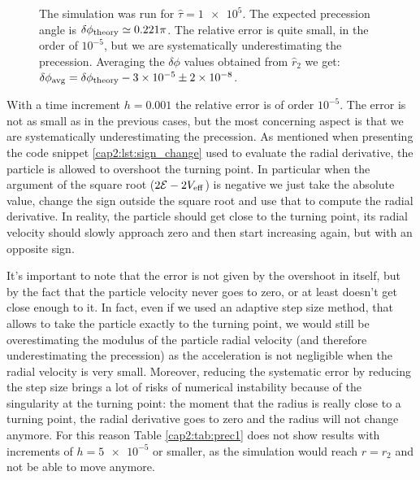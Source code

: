 \begin{figure}[h]
\begin{minipage}{0.48 \textwidth}
        \caption{The simulation was run for $\hat \tau = \num{1e5}$.
        The expected precession angle is $\delta \phi_{\rm theory} \simeq 0.221
        \pi$.
        The relative error is quite small, in the order of $10^{-5}$, but we are
        systematically underestimating the precession.
        Averaging the $\delta \phi$ values obtained from $\hat r_2$ we get: \\
        $\delta \phi_{\rm avg} = \delta \phi_{\rm theory} - \num{3e-5} \pm \num{2e-8}$.}
        \label{cap2:fig:prec2_res}
    \end{minipage}
\end{figure}

With a time increment $h = 0.001$ the relative error is of order $10^{-5}$.
The error is not as small as in the previous cases, but the most concerning
aspect is that we are systematically underestimating the precession.
As mentioned when presenting the code snippet \ref{cap2:lst:sign_change} used to
evaluate the radial derivative, the particle is allowed to overshoot the turning
point.
In particular when the argument of the square root ($2 \mathcal E
- 2 V_{\rm eff}$) is negative we just take the absolute value, change the sign
outside the square root and use that to compute the radial derivative.
In reality, the particle should get close to the turning point, its radial
velocity should slowly approach zero and then start increasing again, but with
an opposite sign.

It's important to note that the error is not given by the overshoot in itself,
but by the fact that the particle velocity never goes to zero, or at least
doesn't get close enough to it.
In fact, even if we used an adaptive step size method, that allows to take the
particle exactly to the turning point, we would still be overestimating the
modulus of the particle radial velocity (and therefore underestimating the
precession) as the acceleration is not negligible when the radial velocity is
very small.
Moreover, reducing the systematic error by reducing the step size brings a lot
of risks of numerical instability because of the singularity at the turning
point: the moment that the radius is really close to a turning point, the radial
derivative goes to zero and the radius will not change anymore.
For this reason Table \ref{cap2:tab:prec1} does not show results with increments
of $h = \num{5e-5}$ or smaller, as the simulation would reach $r = r_2$ and not
be able to move anymore.

